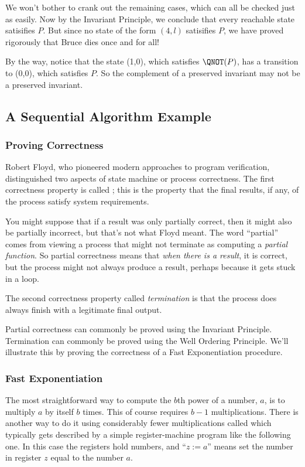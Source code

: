 We won't bother to crank out the remaining cases, which can all be checked
just as easily.  Now by the Invariant Principle, we conclude that every
reachable state satisifies $P$.  But since no state of the form $(4,l)$
satisifies $P$, we have proved rigorously that Bruce dies once and for
all!

By the way, notice that the state (1,0), which satisfies $\QNOT(P)$,
has a transition to (0,0), which satisfies $P$.  So the complement of
a preserved invariant may not be a preserved invariant.

\subsection{A Sequential Algorithm Example}\label{seq_alg_subsec}

\subsubsection{Proving Correctness}

Robert Floyd, who pioneered modern approaches to program verification,
distinguished two aspects of state machine or process correctness.
The first correctness property is called ;
this is the property that the final results, if any, of the process
satisfy system requirements.

You might suppose that if a result was only partially correct, then it
might also be partially incorrect, but that's not what Floyd meant.
The word ``partial'' comes from viewing a process that might not
terminate as computing a \emph{partial function}.  So partial
correctness means that \emph{when there is a result}, it is correct,
but the process might not always produce a result, perhaps because it
gets stuck in a loop.

The second correctness property called \emph{termination} is that the
process does always finish with a legitimate final output.

Partial correctness can commonly be proved using the Invariant
Principle.  Termination can commonly be proved using the Well Ordering
Principle.  We'll illustrate this by proving the correctness of a
Fast Exponentiation procedure.

\subsubsection{Fast Exponentiation}
The most straightforward way to compute the $b$th power of a number,
$a$, is to multiply $a$ by itself $b$ times.  This of course requires
$b-1$ multiplications.  There is another way to do it using
considerably fewer multiplications called 
which typically gets described by a simple register-machine program
like the following one.  In this case the registers hold numbers, and
``$z := a$'' means set the number in register $z$ equal to the number
$a$.

